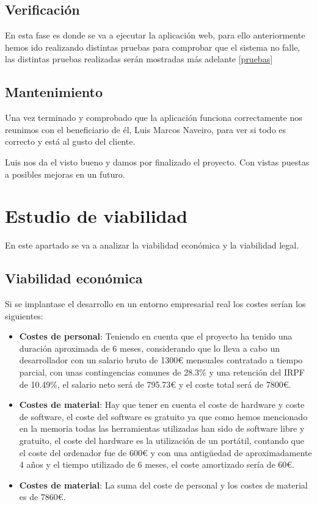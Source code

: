 \subsection{Verificación}

En esta fase es donde se va a ejecutar la aplicación web, para ello anteriormente hemos ido realizando distintas pruebas para comprobar que el sistema no falle, las distintas pruebas realizadas serán mostradas más adelante \ref{pruebas} 

\subsection{Mantenimiento}

Una vez terminado y comprobado que la aplicación funciona correctamente nos reunimos con el beneficiario de él, Luis Marcos Naveiro, para ver si todo es correcto y está al gusto del cliente.

Luis nos da el visto bueno y damos por finalizado el proyecto. Con vistas puestas a posibles mejoras en un futuro.

\section{Estudio de viabilidad}

En este apartado se va a analizar la viabilidad económica y la viabilidad legal.


\subsection{Viabilidad económica}

Si se implantase el desarrollo en un entorno empresarial real los costes serían los siguientes:

\begin{itemize}
	\item \textbf{Costes de personal}: Teniendo en cuenta que el proyecto ha tenido una duración aproximada de 6 meses, considerando que lo lleva a cabo un desarrollador con un salario bruto de 1300\textup{\euro} mensuales contratado a tiempo parcial, con unas contingencias comunes\cite{seguridadSocial} de 28.3\%  y una retención del IRPF de 10.49\%, el salario neto será de 795.73\textup{\euro} y el coste total será de 7800\textup{\euro}.
	
	\item \textbf{Costes de material}: Hay que tener en cuenta el coste de hardware y coste de software, el coste del software es gratuito ya que como hemos mencionado en la memoria todas las herramientas utilizadas han sido de software libre y gratuito, el coste del hardware es la utilización de un portátil, contando que el coste del ordenador fue de 600\textup{\euro} y con una antigüedad de aproximadamente 4 años y el tiempo utilizado de 6 meses, el coste amortizado sería de 60\textup{\euro}.
	
	\item \textbf{Costes de material}: La suma del coste de personal y los costes de material es de 7860\textup{\euro}.

\end{itemize}

